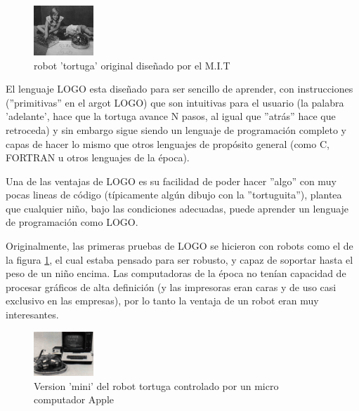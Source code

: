 \begin{figure}
  \begin{center}
    \includegraphics[width=0.2\textwidth]{figuras/logo_robot.jpg}
    \caption[Caption for LOF]{robot 'tortuga' original diseñado por el M.I.T}
    
    \label{fig:tortuga_mit}
  \end{center}
\end{figure}

El lenguaje LOGO esta diseñado para ser sencillo de aprender, con instrucciones (''primitivas'' en el argot LOGO) que son intuitivas para el usuario (la palabra 'adelante', hace que la tortuga avance N pasos,  al igual que ''atrás'' hace que retroceda) y sin embargo sigue siendo un lenguaje de programación completo y capas de hacer lo mismo que otros lenguajes de propósito general  (como C, FORTRAN u otros lenguajes de la época). 

Una de las ventajas de LOGO es su facilidad de poder hacer ''algo'' con muy pocas lineas de código (típicamente algún dibujo con la ''tortuguita''), \cite{seymour_papert_desafio_1987} plantea que cualquier niño, bajo las condiciones adecuadas, puede aprender un lenguaje de programación como LOGO.

Originalmente, las primeras pruebas de LOGO se hicieron con robots como el de la figura \ref{fig:tortuga_mit}, el cual estaba pensado para ser robusto, y capaz de soportar hasta el peso de un niño encima. Las computadoras de la época no tenían capacidad de procesar gráficos de alta definición (y las impresoras eran caras y de uso casi exclusivo en las empresas), por lo tanto la ventaja de un robot eran muy interesantes.

\begin{figure}
  \begin{center}
    \includegraphics[width=0.2\textwidth]{figuras/turtle_with_apple.JPG}
    \caption[Caption for LOF]{Version 'mini' del robot tortuga controlado por un micro computador Apple}
    
    \label{fig:tortuga_2}
  \end{center}
\end{figure}


